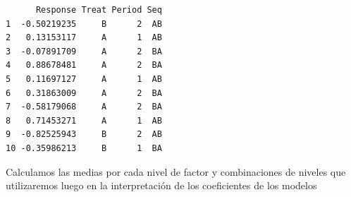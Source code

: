\documentclass[
  12pt,
  a4paper,
  extrafontsizes,
  onecolumn,
  openright]{memoir}
\newenvironment{Shaded}{\begin{snugshade}}{\end{snugshade}}
\newcommand{\AttributeTok}[1]{\textcolor[rgb]{0.40,0.45,0.13}{#1}}
\newcommand{\ConstantTok}[1]{\textcolor[rgb]{0.56,0.35,0.01}{#1}}
\newcommand{\DecValTok}[1]{\textcolor[rgb]{0.68,0.00,0.00}{#1}}
\newcommand{\FunctionTok}[1]{\textcolor[rgb]{0.28,0.35,0.67}{#1}}
\newcommand{\NormalTok}[1]{\textcolor[rgb]{0.00,0.23,0.31}{#1}}
\newcommand{\OtherTok}[1]{\textcolor[rgb]{0.00,0.23,0.31}{#1}}
\newcommand{\SpecialCharTok}[1]{\textcolor[rgb]{0.37,0.37,0.37}{#1}}
\newcommand{\StringTok}[1]{\textcolor[rgb]{0.13,0.47,0.30}{#1}}
\begin{document}
\begin{Shaded}
\end{Shaded}

\begin{verbatim}
      Response Treat Period Seq
1  -0.50219235     B      2  AB
2   0.13153117     A      1  AB
3  -0.07891709     A      2  BA
4   0.88678481     A      2  BA
5   0.11697127     A      1  AB
6   0.31863009     A      2  BA
7  -0.58179068     A      2  BA
8   0.71453271     A      1  AB
9  -0.82525943     B      2  AB
10 -0.35986213     B      1  BA
\end{verbatim}

\normalsize

Calculamos las medias por cada nivel de factor y combinaciones de
niveles que utilizaremos luego en la interpretación de los coeficientes
de los modelos
\end{document}
